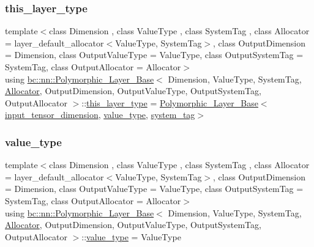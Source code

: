 \subsubsection{\texorpdfstring{this\+\_\+layer\+\_\+type}{this\_layer\_type}\hspace{0.1cm}{\footnotesize\ttfamily [2/2]}}
{\footnotesize\ttfamily template$<$class Dimension , class Value\+Type , class System\+Tag , class Allocator  = layer\+\_\+default\+\_\+allocator$<$\+Value\+Type, System\+Tag$>$, class Output\+Dimension  = Dimension, class Output\+Value\+Type  = Value\+Type, class Output\+System\+Tag  = System\+Tag, class Output\+Allocator  = Allocator$>$ \\
using \hyperlink{structbc_1_1nn_1_1Polymorphic__Layer__Base}{bc\+::nn\+::\+Polymorphic\+\_\+\+Layer\+\_\+\+Base}$<$ Dimension, Value\+Type, System\+Tag, \hyperlink{classbc_1_1allocators_1_1Allocator}{Allocator}, Output\+Dimension, Output\+Value\+Type, Output\+System\+Tag, Output\+Allocator $>$\+::\hyperlink{structbc_1_1nn_1_1Polymorphic__Layer__Base_a6087076d2e0a31e6bbdc2c2039c3ab52}{this\+\_\+layer\+\_\+type} =  \hyperlink{structbc_1_1nn_1_1Polymorphic__Layer__Base}{Polymorphic\+\_\+\+Layer\+\_\+\+Base}$<$ \hyperlink{structbc_1_1nn_1_1Polymorphic__Layer__Base_a9cf367e8f043b3bc7ac8ce8f5aeaa832}{input\+\_\+tensor\+\_\+dimension}, \hyperlink{structbc_1_1nn_1_1Polymorphic__Layer__Base_aa7d46845ee0a4544003a6f8fe3b7f52a}{value\+\_\+type}, \hyperlink{structbc_1_1nn_1_1Polymorphic__Layer__Base_a038901ff126b59392a45ffb2d839b3b0}{system\+\_\+tag}$>$}

\mbox{\label{structbc_1_1nn_1_1Polymorphic__Layer__Base_aa7d46845ee0a4544003a6f8fe3b7f52a}} 
\subsubsection{\texorpdfstring{value\+\_\+type}{value\_type}\hspace{0.1cm}{\footnotesize\ttfamily [1/2]}}
{\footnotesize\ttfamily template$<$class Dimension , class Value\+Type , class System\+Tag , class Allocator  = layer\+\_\+default\+\_\+allocator$<$\+Value\+Type, System\+Tag$>$, class Output\+Dimension  = Dimension, class Output\+Value\+Type  = Value\+Type, class Output\+System\+Tag  = System\+Tag, class Output\+Allocator  = Allocator$>$ \\
using \hyperlink{structbc_1_1nn_1_1Polymorphic__Layer__Base}{bc\+::nn\+::\+Polymorphic\+\_\+\+Layer\+\_\+\+Base}$<$ Dimension, Value\+Type, System\+Tag, \hyperlink{classbc_1_1allocators_1_1Allocator}{Allocator}, Output\+Dimension, Output\+Value\+Type, Output\+System\+Tag, Output\+Allocator $>$\+::\hyperlink{structbc_1_1nn_1_1Polymorphic__Layer__Base_aa7d46845ee0a4544003a6f8fe3b7f52a}{value\+\_\+type} =  Value\+Type}

